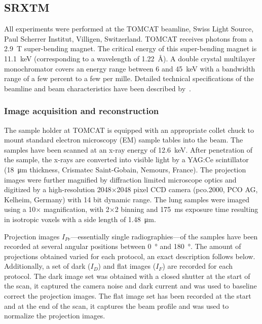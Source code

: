 \subsection{SRXTM}
All experiments were performed at the TOMCAT beamline, Swiss Light Source, Paul Scherrer Institut, Villigen, Switzerland. %
TOMCAT receives photons from a \SI{2.9}{\tesla} super-bending magnet. The critical energy of this super-bending magnet is \SI{11.1}{\kilo\electronvolt} (corresponding to a wavelength of \SI{1.22}{\angstrom}). A double crystal multilayer monochromator covers an energy range between 6 and \SI{45}{\kilo\electronvolt} with a bandwidth range of a few percent to a few per mille. Detailed technical specifications of the beamline and beam characteristics have been described by~\citet{Stampanoni2006a,Stampanoni2007}.

\subsubsection{Image acquisition and reconstruction}
\label{seq:Image Acquisition}
The sample holder at TOMCAT is equipped with an appropriate collet chuck to mount standard electron microscopy (EM) sample tables into the beam. The samples have been scanned at an x-ray energy of \SI{12.6}{\kilo\electronvolt}. After penetration of the sample, the x-rays are converted into visible light by a YAG:Ce scintillator (\SI{18}{\micro\meter} thickness, Crismatec Saint-Gobain, Nemours, France). The projection images were further magnified by diffraction limited microscope optics and digitized by a high-resolution 2048\(\times\)2048 pixel CCD camera (pco.2000, PCO AG, Kelheim, Germany) with 14 bit dynamic range.%
The lung samples were imaged using a 10\(\times\) magnification, with 2\(\times\)2 binning and \SI{175}{\milli\second} exposure time resulting in isotropic voxels with a side length of \SI{1.48}{\micro\meter}.

\cbstart
Projection images $I_{Pr}$---essentially single radiographies---of the samples have been recorded at several angular positions between \SI{0}{\degree} and \SI{180}{\degree}. The amount of projections obtained varied for each protocol, an exact description follows below. Additionally, a set of dark ($I_{D}$) and flat images ($I_{F}$) are recorded for each protocol. The dark image set was obtained with a closed shutter at the start of the scan, it captured the camera noise and dark current and was used to baseline correct the projection images. The flat image set has been recorded at the start and at the end of the scan, it captures the beam profile and was used to normalize the projection images.

